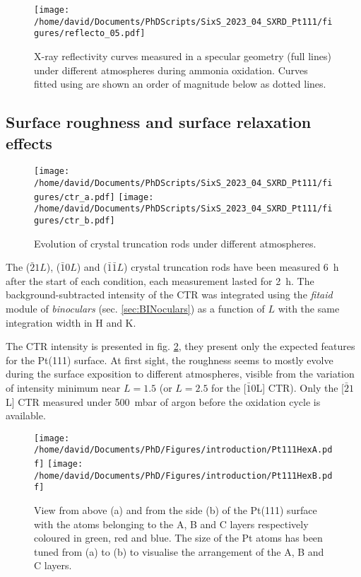 \begin{figure}[!htb]
    \centering
    \texttt{[image: /home/david/Documents/PhDScripts/SixS\_2023\_04\_SXRD\_Pt111/figures/reflecto\_05.pdf]}
    \caption{
    	X-ray reflectivity curves measured in a specular geometry (full lines) under different atmospheres during ammonia oxidation.
    	Curves fitted using  are shown an order of magnitude below as dotted lines.
    }
    \label{fig:reflecto_5}
\end{figure}

\subsection{Surface roughness and surface relaxation effects}

\begin{figure}[!htb]
    \centering
    \texttt{[image: /home/david/Documents/PhDScripts/SixS\_2023\_04\_SXRD\_Pt111/figures/ctr\_a.pdf]}
    \texttt{[image: /home/david/Documents/PhDScripts/SixS\_2023\_04\_SXRD\_Pt111/figures/ctr\_b.pdf]}
    \caption{
        Evolution of crystal truncation rods under different atmospheres.
    }
    \label{fig:CTRPt111}
\end{figure}

The ($\bar{2}1L$), ($\bar{1}0L$) and ($\bar{1}\bar{1}L$) crystal truncation rods have been measured \qty{6}{\hour} after the start of each condition, each measurement lasted for \qty{2}{\hour}.
The background-subtracted intensity of the CTR was integrated using the \textit{fitaid} module of \textit{binoculars} (sec. \ref{sec:BINoculars}) as a function of $L$ with the same integration width in H and K.

The CTR intensity is presented in fig. \ref{fig:CTRPt111}, they present only the expected features for the Pt(111) surface.
At first sight, the roughness seems to mostly evolve during the surface exposition to different atmospheres, visible from the variation of intensity minimum near $L=1.5$ (or $L=2.5$ for the [$\bar{1}$0L] CTR).
Only the [$\bar{2}1$L] CTR measured under \qty{500}{\milli\bar} of argon before the oxidation cycle is available.

\begin{figure}[!htb]
    \centering
    \texttt{[image: /home/david/Documents/PhD/Figures/introduction/Pt111HexA.pdf]}
    \texttt{[image: /home/david/Documents/PhD/Figures/introduction/Pt111HexB.pdf]}
    \caption{
        View from above (a) and from the side (b) of the Pt(111) surface with the atoms belonging to the A, B and C layers respectively coloured in green, red and blue.
        The size of the Pt atoms has been tuned from (a) to (b) to visualise the arrangement of the A, B and C layers.
    }
    \label{fig:Pt111StructureSideAndTop}
\end{figure}

